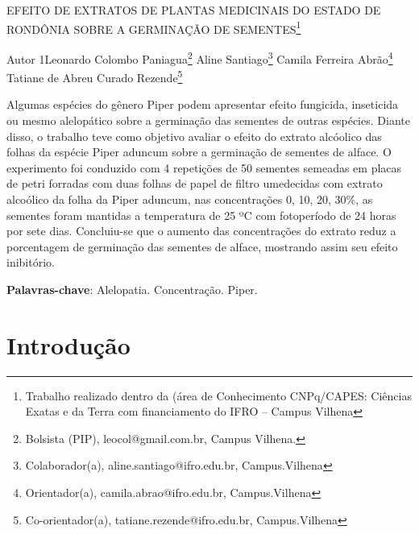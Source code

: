 \documentclass[article,12pt,onesidea,4paper,english,brazil]{abntex2}
\begin{document}
	
	
	\frenchspacing 
	
	\begin{center}
		\LARGE EFEITO DE EXTRATOS DE PLANTAS MEDICINAIS DO ESTADO DE RONDÔNIA SOBRE A GERMINAÇÃO DE SEMENTES\footnote{Trabalho realizado dentro da (área de Conhecimento CNPq/CAPES: Ciências Exatas e da Terra com financiamento do IFRO – Campus Vilhena}
		
		\normalsize
		Autor 1Leonardo Colombo Paniagua\footnote{Bolsista (PIP), leocol@gmail.com.br, Campus Vilhena.} 
		Aline Santiago\footnote{Colaborador(a), aline.santiago@ifro.edu.br, Campus.Vilhena} 
		Camila Ferreira Abrão\footnote{Orientador(a), camila.abrao@ifro.edu.br, Campus.Vilhena} 
		 Tatiane de Abreu Curado Rezende\footnote{Co-orientador(a), tatiane.rezende@ifro.edu.br, Campus.Vilhena} 
	\end{center}
	
	\begin{resumoumacoluna}
		Algumas espécies do gênero Piper podem apresentar efeito fungicida, inseticida ou mesmo alelopático sobre a germinação das sementes de outras espécies. Diante disso, o trabalho teve como objetivo avaliar o efeito do extrato alcóolico das folhas da espécie Piper aduncum sobre a germinação de sementes de alface. O experimento foi conduzido com 4 repetições de 50 sementes semeadas em placas de petri forradas com duas folhas de papel de filtro umedecidas com extrato alcoólico da folha da Piper aduncum, nas concentrações 0, 10, 20, 30\%, as sementes foram mantidas a temperatura de 25 ºC com fotoperíodo de 24 horas por sete dias. Concluiu-se que o aumento das concentrações do extrato reduz a porcentagem de germinação das sementes de alface, mostrando assim seu efeito inibitório.
		
		\vspace{\onelineskip}
		
		\noindent
		\textbf{Palavras-chave}: Alelopatia. Concentração. Piper.
		
	\end{resumoumacoluna}
	
	\section*{Introdução}
	
\end{document}
